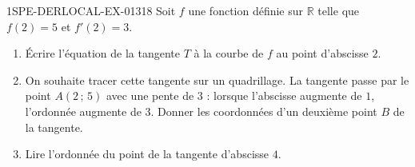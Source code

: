 \begin{exercice}{1SPE-DERLOCAL-EX-013}{1}{8}
Soit $f$ une fonction définie sur $\mathbb{R}$ telle que $f(2) = 5$ et $f'(2) = 3$.

\begin{enumerate}
  \item Écrire l'équation de la tangente $T$ à la courbe de $f$ au point d'abscisse $2$.
  \item On souhaite tracer cette tangente sur un quadrillage. La tangente passe par le point $A(2\,;\,5)$ avec une pente de $3$ : lorsque l'abscisse augmente de $1$, l'ordonnée augmente de $3$. Donner les coordonnées d'un deuxième point $B$ de la tangente.
  \item Lire l'ordonnée du point de la tangente d'abscisse $4$.
\end{enumerate}
\end{exercice}
